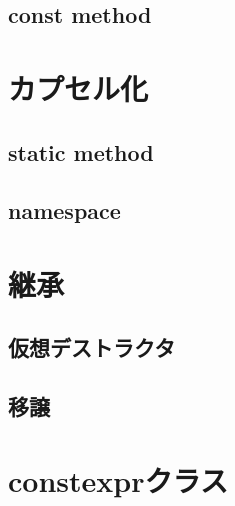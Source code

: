 \subsection{const method}



\section{カプセル化}
\subsection{static method}


\subsection{namespace}


\section{継承}
\subsection{仮想デストラクタ}
\subsection{移譲}

\section{constexprクラス}

